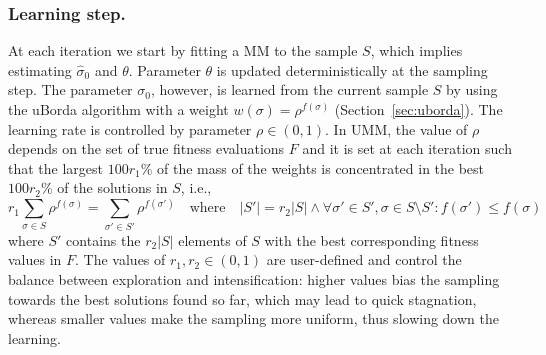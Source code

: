 \documentclass[runningheads]{llncs}
\begin{document}
\subsubsection{Learning step.}
At each iteration we start by fitting a MM to the sample $S$, which implies
estimating $\hat\sigma_0$ and $\theta$. Parameter $\theta$ is updated
deterministically at the sampling step.  The parameter $\sigma_0$, however, is
learned from the current sample $S$ by using the uBorda algorithm with a weight
$w(\sigma)=\rho^{f(\sigma)}$ (Section~\ref{sec:uborda}). The learning rate is
controlled by parameter $\rho \in (0,1)$. %
In UMM, the value of $\rho$ depends on the set of true fitness evaluations $F$
and it is set at each iteration such that the largest $100r_1$\% of the mass of
the weights is concentrated in the best $100r_2$\% of the solutions in $S$, i.e.,
%
\begin{equation}
r_1 \sum_{\sigma\in S}\rho^{f(\sigma)} =  \sum_{\sigma'\in S'}\rho^{f(\sigma')} \quad\text{where}\quad |S'| = r_2|S| \land \forall \sigma'\in S', \sigma\in S\setminus S' : f(\sigma')\leq f(\sigma)
\end{equation}
%
where $S'$ contains the $r_2|S|$ elements of $S$ with the best corresponding fitness values in $F$. The values of $r_1, r_2 \in (0, 1)$ are user-defined and control the balance between exploration and intensification: higher values bias the sampling towards the best solutions found so far, which may lead to quick stagnation, whereas smaller values make the sampling more uniform, thus slowing down the learning.



\end{document}
